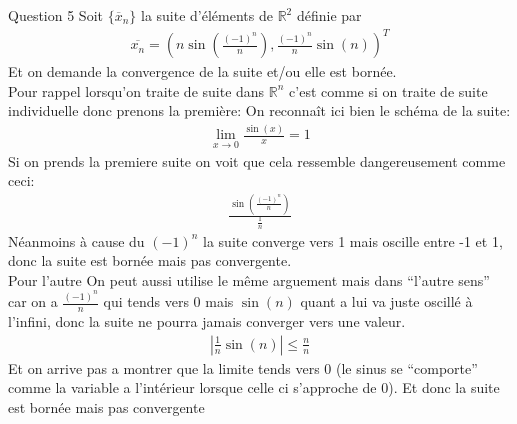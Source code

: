 \begin{parag}{Question 5}
    Soit $\{\overline{x}_n\}$ la suite d'éléments de $\mathbb{R}^2$ définie par
    \begin{align*} \overline{x_n} = \left(n\sin\left(\frac{\left(-1\right)^n}{n}\right), \frac{\left(-1\right)^n}{n}\sin\left(n\right)\right)^T \end{align*}
    Et on demande la convergence de la suite et/ou elle est bornée.\\
    Pour rappel lorsqu'on traite de suite dans $\mathbb{R}^n$ c'est comme si on traite de suite individuelle donc prenons la première:
    On reconnaît ici bien le schéma de la suite:
    \begin{align*} \lim_{x \to 0} \frac{\sin\left(x\right)}{x} = 1 \end{align*}
    Si on prends la premiere suite on voit que cela ressemble dangereusement comme ceci:
    \begin{align*} \frac{\sin\left(\frac{\left(-1\right)^n}{n}\right)}{\frac{1}{n}} \end{align*}
    Néanmoins à cause du $\left(-1\right)^n$ la suite converge  vers 1 mais oscille entre -1 et 1, donc la suite est bornée mais pas convergente.\\
    Pour l'autre On peut aussi utilise le même arguement mais dans ``l'autre sens'' car on a $\frac{\left(-1\right)^n}{n}$ qui tends vers 0 mais $\sin\left(n\right)$ quant a lui va juste oscillé à l'infini, donc la suite ne pourra jamais converger vers une valeur.\\
    \begin{align*} \left|\frac{1}{n}\sin\left(n\right)\right| \leq \frac{n}{n} \end{align*}
    Et on arrive pas a montrer que la limite tends vers 0 (le sinus se ``comporte'' comme la variable a l'intérieur lorsque celle ci s'approche de 0).
    Et donc la suite est bornée mais pas convergente


\end{parag}


